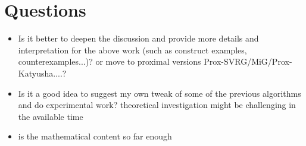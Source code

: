 \documentclass[12pt]{report}
\newcounter{theo}[section]
\begin{document}
\chapter{Questions}
\begin{itemize}
    \item Is it better to deepen the discussion and provide more details and interpretation for the above work (such as construct examples, counterexamples...)?  or move to proximal versions Prox-SVRG/MiG/Prox-Katyusha....?
    \item Is it a good idea to suggest my own tweak of some of the previous algorithms and do experimental work? theoretical investigation might be challenging in the available time
    \item is the mathematical content so far enough
\end{itemize}

{}

\end{document}
